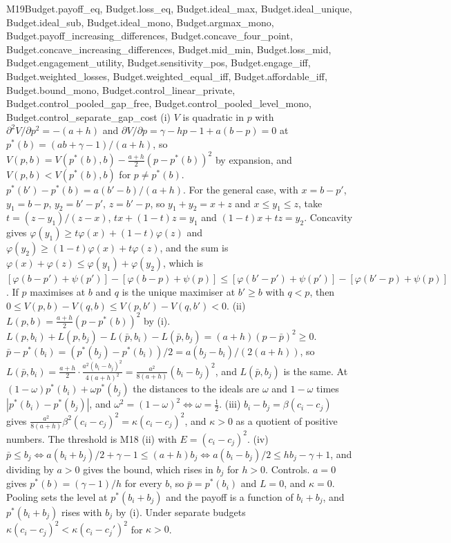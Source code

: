 \begin{mproof}{M19}{Budget.payoff_eq, Budget.loss_eq, Budget.ideal_max, Budget.ideal_unique, Budget.ideal_sub, Budget.ideal_mono, Budget.argmax_mono, Budget.payoff_increasing_differences, Budget.concave_four_point, Budget.concave_increasing_differences, Budget.mid_min, Budget.loss_mid, Budget.engagement_utility, Budget.sensitivity_pos, Budget.engage_iff, Budget.weighted_losses, Budget.weighted_equal_iff, Budget.affordable_iff, Budget.bound_mono, Budget.control_linear_private, Budget.control_pooled_gap_free, Budget.control_pooled_level_mono, Budget.control_separate_gap_cost}
(i) $V$ is quadratic in $p$ with $\partial^2V/\partial p^2=-(a+h)$ and
$\partial V/\partial p=\gamma-hp-1+a(b-p)=0$ at $p^*(b)=(ab+\gamma-1)/(a+h)$,
so $V(p,b)=V(p^*(b),b)-\tfrac{a+h}{2}(p-p^*(b))^2$ by expansion, and
$V(p,b)<V(p^*(b),b)$ for $p\ne p^*(b)$.
$p^*(b')-p^*(b)=a(b'-b)/(a+h)$. For the general case, with $x=b-p'$,
$y_1=b-p$, $y_2=b'-p'$, $z=b'-p$, so $y_1+y_2=x+z$ and $x\le y_1\le z$, take
$t=(z-y_1)/(z-x)$, $tx+(1-t)z=y_1$ and $(1-t)x+tz=y_2$. Concavity gives
$\varphi(y_1)\ge t\varphi(x)+(1-t)\varphi(z)$ and
$\varphi(y_2)\ge(1-t)\varphi(x)+t\varphi(z)$, and the sum is
$\varphi(x)+\varphi(z)\le\varphi(y_1)+\varphi(y_2)$, which is
$[\varphi(b-p')+\psi(p')]-[\varphi(b-p)+\psi(p)]\le
[\varphi(b'-p')+\psi(p')]-[\varphi(b'-p)+\psi(p)]$. If $p$ maximises at
$b$ and $q$ is the unique maximiser at $b'\ge b$ with $q<p$, then
$0\le V(p,b)-V(q,b)\le V(p,b')-V(q,b')<0$.
(ii) $L(p,b)=\tfrac{a+h}{2}(p-p^*(b))^2$ by (i).
$L(p,b_i)+L(p,b_j)-L(\bar p,b_i)-L(\bar p,b_j)=(a+h)(p-\bar p)^2\ge0$.
$\bar p-p^*(b_i)=(p^*(b_j)-p^*(b_i))/2=a(b_j-b_i)/(2(a+h))$, so
$L(\bar p,b_i)=\tfrac{a+h}{2}\cdot\tfrac{a^2(b_i-b_j)^2}{4(a+h)^2}
=\tfrac{a^2}{8(a+h)}(b_i-b_j)^2$, and $L(\bar p,b_j)$ is the same.
At $(1-\omega)p^*(b_i)+\omega p^*(b_j)$ the distances to the ideals are
$\omega$ and $1-\omega$ times $|p^*(b_i)-p^*(b_j)|$, and
$\omega^2=(1-\omega)^2\iff\omega=\tfrac12$.
(iii) $b_i-b_j=\beta(c_i-c_j)$ gives
$\tfrac{a^2}{8(a+h)}\beta^2(c_i-c_j)^2=\kappa(c_i-c_j)^2$, and
$\kappa>0$ as a quotient of positive numbers. The threshold is M18 (ii)
with $E=(c_i-c_j)^2$.
(iv) $\bar p\le b_j\iff a(b_i+b_j)/2+\gamma-1\le(a+h)b_j
\iff a(b_i-b_j)/2\le hb_j-\gamma+1$, and dividing by $a>0$ gives the
bound, which rises in $b_j$ for $h>0$.
Controls. $a=0$ gives $p^*(b)=(\gamma-1)/h$ for every $b$, so
$\bar p=p^*(b_i)$ and $L=0$, and $\kappa=0$. Pooling sets the level at
$p^*(b_i+b_j)$ and the payoff is a function of $b_i+b_j$, and
$p^*(b_i+b_j)$ rises with $b_j$ by (i). Under separate budgets
$\kappa(c_i-c_j)^2<\kappa(c_i-c_j')^2$ for $\kappa>0$.
\end{mproof}

